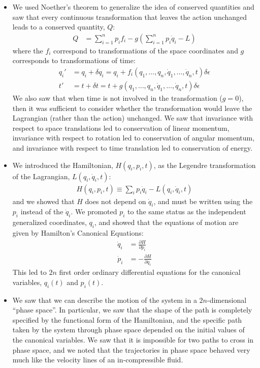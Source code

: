 \documentclass[10pt]{report}
\newcommand{\die}[2]{\frac{\partial #1}{\partial #2}}
\begin{document}
\begin{itemize}
\begin{align*}
p_i&\equiv \die{L}{\dot q_i}
\end{align*}
\item We used Noether's theorem to generalize the idea of conserved quantities and saw that every continuous transformation that leaves the action unchanged leads to a conserved quantity, $Q$:
\begin{align*}
Q&=\sum_{i=1}^n p_if_i -g\left(\sum_{i=1}^n p_i\dot{q}_i-L\right)
\end{align*}
where the $f_i$ correspond to transformations of the space coordinates and $g$ corresponds to transformations of time:
\begin{align*}
q_i'&=q_i+\delta q_i=q_i+f_i(q_1,\dots ,q_n,\dot{q}_1,\dots ,\dot{q}_n, t)\delta\epsilon\\
t'&=t+\delta t=t+g(q_1,\dots ,q_n,\dot{q}_1,\dots ,\dot{q}_n, t)\delta\epsilon
\end{align*}
We also saw that when time is not involved in the transformation ($g=0$), then it was sufficient to consider whether the transformation would leave the Lagrangian (rather than the action) unchanged. We saw that invariance with respect to space translations led to conservation of linear momentum, invariance with respect to rotation led to conservation of angular momentum, and invariance with respect to time translation led to conservation of energy.
\item We introduced the Hamiltonian, $H(q_i,p_i, t)$, as the Legendre transformation of the Lagrangian, $L(q_i,\dot q_i, t)$:
\begin{align*}
H(q_i,p_i,t)\equiv \sum_ip_i\dot q_i-L(q_i,\dot q_i, t)
\end{align*}
and we showed that $H$ does not depend on $\dot q_i$, and must be written using the $p_i$ instead of the $\dot q_i$. We promoted $p_i$ to the same status as the independent generalized coordinates, $q_i$, and showed that the equations of motion are given by Hamilton's Canonical Equations:
\begin{align*}
\dot q_i&=\die{H}{p_i} \nonumber\\
\dot p_i &= -\die{H}{q_i}
\end{align*}
This led to $2n$ first order ordinary differential equations for the canonical variables, $q_i(t)$ and $p_i(t)$.
\item We saw that we can describe the motion of the system in a $2n$-dimensional ``phase space''. In  particular, we saw that the shape of the path is completely specified by the functional form of the Hamiltonian, and the specific path taken by the system through phase space depended on the initial values of the canonical variables. We saw that it is impossible for two paths to cross in phase space, and we noted that the trajectories in phase space behaved very much like the velocity lines of an in-compressible fluid.

\end{itemize}
\end{document}
